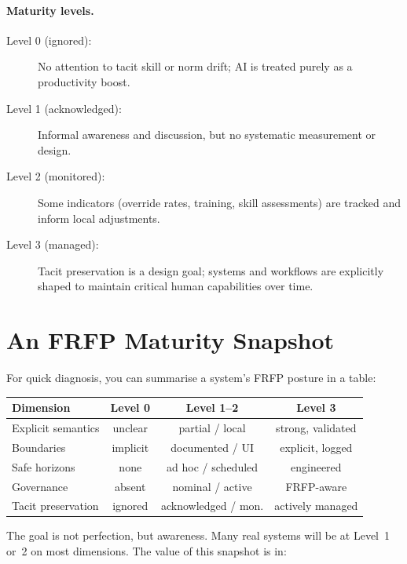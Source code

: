 \paragraph{Maturity levels.}

\begin{description}
  \item[Level 0 (ignored):]
    No attention to tacit skill or norm drift; AI is treated purely as a
    productivity boost.
  \item[Level 1 (acknowledged):]
    Informal awareness and discussion, but no systematic measurement or
    design.
  \item[Level 2 (monitored):]
    Some indicators (override rates, training, skill assessments) are
    tracked and inform local adjustments.
  \item[Level 3 (managed):]
    Tacit preservation is a design goal; systems and workflows are
    explicitly shaped to maintain critical human capabilities over
    time.
\end{description}

\section{An FRFP Maturity Snapshot}

For quick diagnosis, you can summarise a system’s FRFP posture in a
table:

\begin{center}
\begin{tabular}{lccc}
\toprule
\textbf{Dimension} & \textbf{Level 0} & \textbf{Level 1--2} & \textbf{Level 3} \\
\midrule
Explicit semantics     & unclear      & partial / local     & strong, validated \\
Boundaries             & implicit     & documented / UI     & explicit, logged \\
Safe horizons          & none         & ad hoc / scheduled  & engineered        \\
Governance             & absent       & nominal / active    & FRFP-aware        \\
Tacit preservation     & ignored      & acknowledged / mon. & actively managed  \\
\bottomrule
\end{tabular}
\end{center}

The goal is not perfection, but awareness.
Many real systems will be at Level~1 or~2 on most dimensions.
The value of this snapshot is in:

